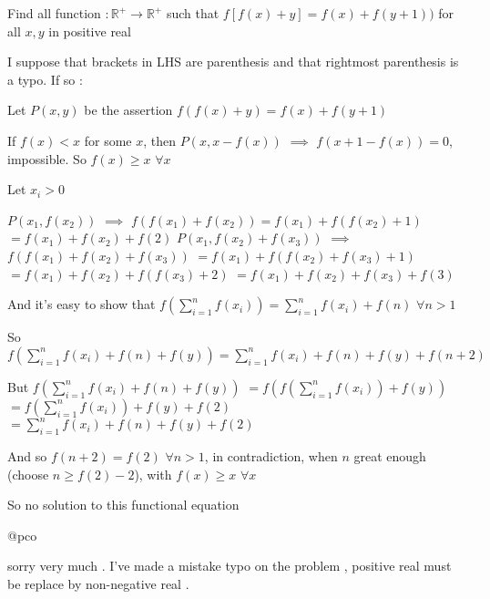 \begin{solution}
	\begin{tcolorbox}Find all function $: \mathbb{R^+} \rightarrow \mathbb{R^+}$ such that $ f[f(x)+y] = f(x) + f(y+1)) $ for all $ x,y $ in positive real\end{tcolorbox}
I suppose that brackets in LHS are parenthesis and that rightmost parenthesis is a typo. If so :

Let $P(x,y)$ be the assertion $f(f(x)+y)=f(x)+f(y+1)$

If $f(x)<x$ for some $x$, then $P(x,x-f(x))$ $\implies$ $f(x+1-f(x))=0$, impossible. So $f(x)\ge x$ $\forall x$

Let $x_i>0$

$P(x_1,f(x_2))$ $\implies$ $f(f(x_1)+f(x_2))=f(x_1)+f(f(x_2)+1)$ $=f(x_1)+f(x_2)+f(2)$
$P(x_1,f(x_2)+f(x_3))$ $\implies$ $f(f(x_1)+f(x_2)+f(x_3))$ $=f(x_1)+f(f(x_2)+f(x_3)+1)$ $=f(x_1)+f(x_2)+f(f(x_3)+2)$ $=f(x_1)+f(x_2)+f(x_3)+f(3)$

And it's easy to show that $f(\sum_{i=1}^n f(x_i))=\sum_{i=1}^n f(x_i)+f(n)$ $\forall n>1$

So $f(\sum_{i=1}^n f(x_i)+f(n)+f(y))=\sum_{i=1}^n f(x_i)+f(n)+f(y)+f(n+2)$

But $f(\sum_{i=1}^n f(x_i)+f(n)+f(y))$ $=f(f(\sum_{i=1}^n f(x_i))+f(y))$ $=f(\sum_{i=1}^n f(x_i))+f(y)+f(2)$ $=\sum_{i=1}^n f(x_i)+f(n)+f(y)+f(2)$

And so $f(n+2)=f(2)$ $\forall n>1$, in contradiction, when $n$ great enough (choose $n\ge f(2)-2$), with $f(x)\ge x$ $\forall x$ 

So no solution to this functional equation
\end{solution}



\begin{solution}
	\begin{bolded}@pco\end{bolded} sorry very much . I've made a mistake typo on the problem , positive real must be replace by non-negative real .
\end{solution}



